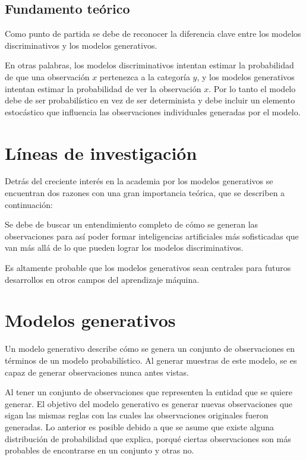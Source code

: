 \subsection{Fundamento teórico}

Como punto de partida se debe de reconocer la diferencia clave entre los modelos discriminativos y los modelos generativos. 


En otras palabras, los modelos discriminativos intentan estimar la probabilidad de que una observación $x$ pertenezca a la categoría $y$, y los modelos generativos intentan estimar la probabilidad de ver la observación $x$. Por lo tanto el modelo debe de ser probabilístico en vez de ser determinista y debe incluir un elemento estocástico que influencia las observaciones individuales generadas por el modelo.

\section{Líneas de investigación}

Detrás del creciente interés en la academia por los modelos generativos se encuentran dos razones con una gran importancia teórica, que se describen a continuación:

Se debe de buscar un entendimiento completo de cómo se generan las observaciones para así poder formar inteligencias artificiales más sofisticadas que van más allá de lo que pueden lograr los modelos discriminativos. 

Es altamente probable que los modelos generativos sean centrales para futuros desarrollos  en otros campos del aprendizaje máquina.

\section{Modelos generativos}

Un modelo generativo describe cómo se genera un conjunto de observaciones en términos de un modelo probabilístico. Al generar muestras de este modelo, se es capaz de generar observaciones nunca antes vistas. 

Al tener un conjunto de observaciones que representen la entidad que se quiere generar. El objetivo del modelo generativo es generar nuevas observaciones que sigan las mismas reglas con las cuales las observaciones originales fueron generadas. Lo anterior es posible debido a que se asume que existe alguna distribución de probabilidad que explica, porqué ciertas observaciones son más probables de encontrarse en un conjunto y otras no. 

